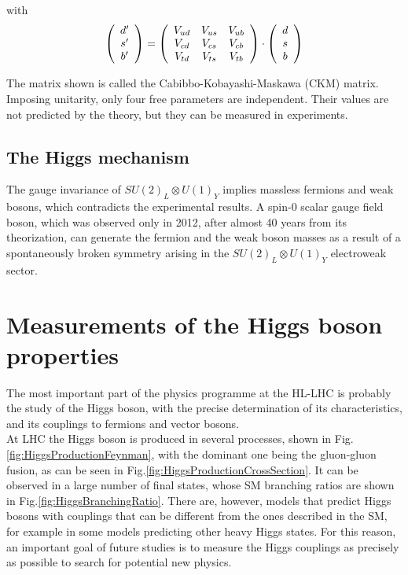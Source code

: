 \documentclass[a4paper,twoside,12pt]{book}
\begin{document}
with
\begin{equation*}
\centering
%
 \left( \begin{array}{c}
d'  \\
s' \\
b' \\
\end{array} \right) = 
%
 \left( \begin{array}{c c c}
V_{ud} & V_{us} & V_{ub}  \\
V_{cd} & V_{cs} & V_{cb}  \\
V_{td} & V_{ts} & V_{tb}  \\
\end{array} \right) \cdot
%
 \left( \begin{array}{c}
d  \\
s \\
b \\
\end{array} \right)
%
\end{equation*}

The matrix shown is called the Cabibbo-Kobayashi-Maskawa (CKM) matrix. Imposing
unitarity, only four free parameters are independent. Their values
are not predicted by the theory, but they can be measured in experiments. 

\subsection*{The Higgs mechanism}
The gauge invariance of $SU (2)_{L} \otimes U (1)_{Y}$ implies massless fermions and weak
bosons, which contradicts the experimental results. A spin-0 scalar gauge field boson, which
was observed only in 2012, after almost 40 years from its theorization\cite{TheoreticalHiggs},
 can generate the fermion and the weak boson masses as a result of a spontaneously
 broken symmetry arising in the $SU (2)_{L} \otimes U (1)_{Y}$ electroweak sector.

\section{Measurements of the Higgs boson \\ 
	properties}
The most important part of the physics programme at the HL-LHC is probably the study of the Higgs boson, with the precise determination of its characteristics, 
and its couplings to fermions and vector bosons\cite{loi}. \\

At LHC the Higgs boson is produced in several processes, shown in \mbox{Fig.\ref{fig:HiggsProductionFeynman}}, with
the dominant one being the gluon-gluon fusion, as can be seen in \mbox{Fig.\ref{fig:HiggsProductionCrossSection}}. It can be observed
in a large number of final states, whose SM branching ratios are shown in \mbox{Fig.\ref{fig:HiggsBranchingRatio}}. There are, however, models that
predict Higgs bosons with couplings that can be different from the ones described in the
SM, for example in some models predicting other heavy Higgs states. For this reason, an important goal of future studies is
to measure the Higgs couplings as precisely as possible to search for potential new physics. \\
\end{document}
